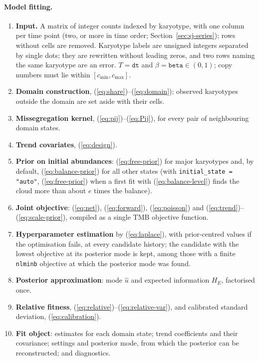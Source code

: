 \documentclass[11pt]{article}
\begin{document}
\paragraph{Model fitting.}
\begin{enumerate}
\item \textbf{Input.} A matrix of integer counts indexed by karyotype, with
one column per time point (two, or more in time order;
Section~\ref{sec:sj-series}); rows without cells are removed. Karyotype
labels are unsigned integers separated by single dots; they are rewritten
without leading zeros, and two rows naming the same karyotype are an error.
$T=\texttt{dt}$ and $\beta=\texttt{beta}\in(0,1)$; copy numbers must lie
within $[c_{\min},c_{\max}]$.
\item \textbf{Domain construction}, (\ref{eq:share})--(\ref{eq:domain});
observed karyotypes outside the domain are set aside with their cells.
\item \textbf{Missegregation kernel}, (\ref{eq:pij})--(\ref{eq:Pij}), for
every pair of neighbouring domain states.
\item \textbf{Trend covariates}, (\ref{eq:design}).
\item \textbf{Prior on initial abundances}: (\ref{eq:free-prior}) for major
karyotypes and, by default, (\ref{eq:balance-prior}) for all other states
(with \texttt{initial\_state = "auto"}, (\ref{eq:free-prior}) when a first fit
with (\ref{eq:balance-level}) finds the cloud more than about $e$ times the
balance).
\item \textbf{Joint objective}: (\ref{eq:net}), (\ref{eq:forward}),
(\ref{eq:poisson}) and (\ref{eq:trend})--(\ref{eq:scale-prior}), compiled as a
single TMB objective function.
\item \textbf{Hyperparameter estimation} by (\ref{eq:laplace}), with
prior-centred values if the optimisation fails, at every candidate history;
the candidate with the lowest objective at its posterior mode is kept, among
those with a finite \texttt{nlminb} objective at which the posterior mode was
found.
\item \textbf{Posterior approximation}: mode $\hat u$ and expected information
$H_E$, factorised once.
\item \textbf{Relative fitness}, (\ref{eq:relative})--(\ref{eq:relative-var}),
and calibrated standard deviation, (\ref{eq:calibration}).
\item \textbf{Fit object}: estimates for each domain state; trend coefficients
and their covariance; settings and posterior mode, from which the posterior
can be reconstructed; and diagnostics.
\end{enumerate}
\end{document}

